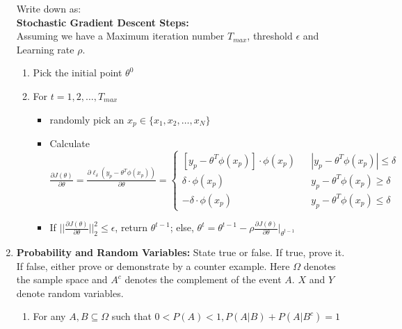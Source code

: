 \documentclass[12pt]{article}
\begin{document}
\begin{enumerate}
        Write down as:\\
        \textbf{Stochastic Gradient Descent Steps:}\\
        Assuming we have a Maximum iteration number $T_{max}$, threshold $\epsilon$ and Learning rate $\rho$.
        \begin{enumerate}[label=(\roman*)]
            \item Pick the initial point $\theta^0$
            \item For $t = 1,2, \dots, T_{max}$
            \begin{itemize}
                \item randomly pick an $x_p \in \{x_1, x_2, \dots, x_N\}$
                \item Calculate $\frac{\partial J(\theta)}{\partial \theta} = \frac{\partial \ell_\delta(y_p - \theta^T\phi(x_p))}{\partial \theta} = \left\{ 
                    \begin{array}{rcl}
                        [y_p-\theta^T\phi(x_p)] \cdot \phi(x_p)  & & |y_p-\theta^T\phi(x_p)| \le \delta \\
                        \delta\cdot \phi(x_p) & & y_p-\theta^T\phi(x_p) \ge \delta \\
                        -\delta\cdot \phi(x_p) & & y_p-\theta^T\phi(x_p) \le \delta
                    \end{array} 
                \right.$
                \item If $||\frac{\partial J(\theta)}{\partial \theta}||_2^2 \le \epsilon$, return $\theta^{t-1}$; else, $\theta^t = \theta^{t-1} - \rho\frac{\partial J(\theta)}{\partial \theta}|_{\theta^{t-1}}$
            \end{itemize}
        \end{enumerate}


        \item \textbf{Probability and Random Variables:} State true or false. If true, prove it. If false, either prove or demonstrate by a counter example. Here $\Omega$ denotes the sample space and $A^c$ denotes the complement of the event $A$. $X$ and $Y$ denote random variables.
        \begin{enumerate}
            \item For any $A, B \subseteq \Omega$ such that $0 < P(A) < 1, P(A|B) + P(A|B^c) =1$
            

\end{enumerate}
\end{enumerate}
\end{document}
